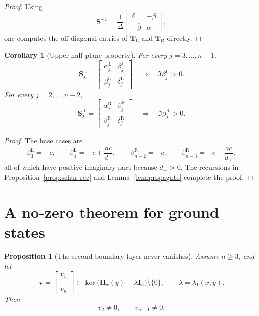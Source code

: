 \documentclass[11pt]{article}
\numberwithin{equation}{section}
\newtheorem{proposition}[theorem]{Proposition}
\newtheorem{corollary}[theorem]{Corollary}
\begin{document}
\begin{proof}
Using
\[
\mathbf S^{-1}
=
\frac{1}{\Delta}
\begin{bmatrix}
\delta & -\beta\\
-\overline\beta & \alpha
\end{bmatrix},
\]
one computes the off-diagonal entries of $\mathbf T_{\mathrm L}$ and
$\mathbf T_{\mathrm R}$ directly.
\end{proof}

\begin{corollary}[Upper-half-plane property]\label{cor:upper}
For every $j=3,\dots,n-1$,
\[
\mathbf S_j^{\mathrm L}
=
\begin{bmatrix}
\alpha_j^{\mathrm L} & \beta_j^{\mathrm L}\\
\overline{\beta_j^{\mathrm L}} & \delta_j^{\mathrm L}
\end{bmatrix}
\quad\Longrightarrow\quad
\Im\beta_j^{\mathrm L}>0.
\]
For every $j=2,\dots,n-2$,
\[
\mathbf S_j^{\mathrm R}
=
\begin{bmatrix}
\alpha_j^{\mathrm R} & \beta_j^{\mathrm R}\\
\overline{\beta_j^{\mathrm R}} & \delta_j^{\mathrm R}
\end{bmatrix}
\quad\Longrightarrow\quad
\Im\beta_j^{\mathrm R}>0.
\]
\end{corollary}

\begin{proof}
The base cases are
\[
\beta_3^{\mathrm L}=-c,
\qquad
\beta_4^{\mathrm L}=-c+\frac{a\overline c}{d_-},
\qquad
\beta_{n-2}^{\mathrm R}=-c,
\qquad
\beta_{n-3}^{\mathrm R}=-c+\frac{a\overline c}{d_+},
\]
all of which have positive imaginary part because $d_\pm>0$.  The recursions
in Proposition~\ref{prop:schur-rec} and Lemma~\ref{lem:propagate} complete
the proof.
\end{proof}

\section{A no-zero theorem for ground states}\label{sec:nozero}

\begin{proposition}[The second boundary layer never vanishes]
\label{prop:second-layer}
Assume $n\ge3$, and let
\[
\bm v=
\begin{bmatrix}
v_1\\
\vdots\\
v_n
\end{bmatrix}
\in
\ker\bigl(\mathbf H_x(y)-\lambda\mathbf I_n\bigr)\setminus\{0\},
\qquad
\lambda=\lambda_1(x,y).
\]
Then
\[
v_2\neq0,
\qquad
v_{n-1}\neq0.
\]
\end{proposition}
\end{document}
